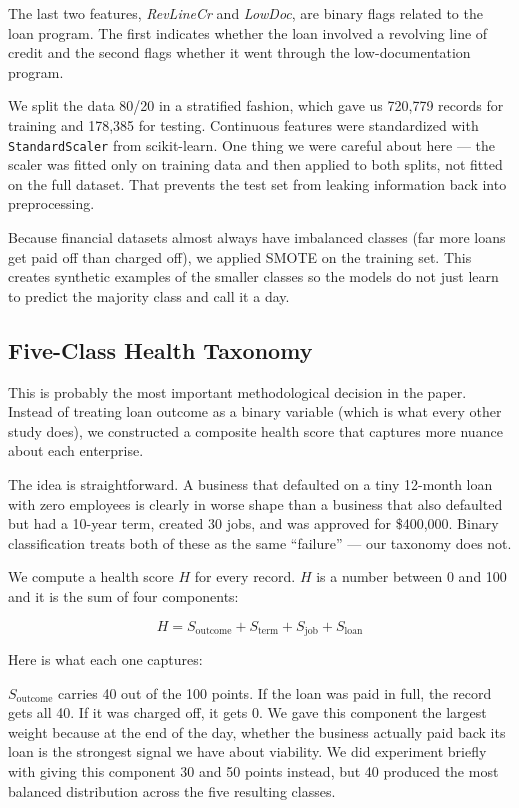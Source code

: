 The last two features, \textit{RevLineCr} and \textit{LowDoc}, are binary flags related to the loan program. The first indicates whether the loan involved a revolving line of credit and the second flags whether it went through the low-documentation program.

We split the data 80/20 in a stratified fashion, which gave us 720,779 records for training and 178,385 for testing. Continuous features were standardized with \texttt{StandardScaler} from scikit-learn. One thing we were careful about here --- the scaler was fitted only on training data and then applied to both splits, not fitted on the full dataset. That prevents the test set from leaking information back into preprocessing.

Because financial datasets almost always have imbalanced classes (far more loans get paid off than charged off), we applied SMOTE \cite{12} on the training set. This creates synthetic examples of the smaller classes so the models do not just learn to predict the majority class and call it a day.

\subsection{Five-Class Health Taxonomy}

This is probably the most important methodological decision in the paper. Instead of treating loan outcome as a binary variable (which is what every other study does), we constructed a composite health score that captures more nuance about each enterprise.

The idea is straightforward. A business that defaulted on a tiny 12-month loan with zero employees is clearly in worse shape than a business that also defaulted but had a 10-year term, created 30 jobs, and was approved for \$400,000. Binary classification treats both of these as the same ``failure'' --- our taxonomy does not.

We compute a health score $H$ for every record. $H$ is a number between 0 and 100 and it is the sum of four components:

\begin{equation}
H = S_{\text{outcome}} + S_{\text{term}} + S_{\text{job}} + S_{\text{loan}}
\end{equation}

Here is what each one captures:

$S_{\text{outcome}}$ carries 40 out of the 100 points. If the loan was paid in full, the record gets all 40. If it was charged off, it gets 0. We gave this component the largest weight because at the end of the day, whether the business actually paid back its loan is the strongest signal we have about viability. We did experiment briefly with giving this component 30 and 50 points instead, but 40 produced the most balanced distribution across the five resulting classes.

